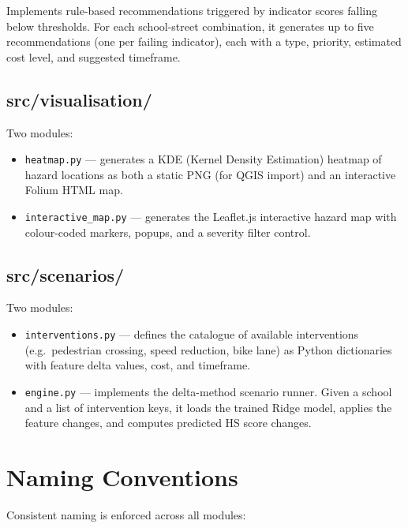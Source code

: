 \documentclass[11pt,a4paper,openany]{book}
\begin{document}
Implements rule-based recommendations triggered by indicator scores falling below thresholds. For each school-street combination, it generates up to five recommendations (one per failing indicator), each with a type, priority, estimated cost level, and suggested timeframe.

\subsection{src/visualisation/}

Two modules:
\begin{itemize}
  \item \texttt{heatmap.py} --- generates a KDE (Kernel Density Estimation) heatmap of hazard locations as both a static PNG (for QGIS import) and an interactive Folium HTML map.
  \item \texttt{interactive\_map.py} --- generates the Leaflet.js interactive hazard map with colour-coded markers, popups, and a severity filter control.
\end{itemize}

\subsection{src/scenarios/}

Two modules:
\begin{itemize}
  \item \texttt{interventions.py} --- defines the catalogue of available interventions (e.g.\ pedestrian crossing, speed reduction, bike lane) as Python dictionaries with feature delta values, cost, and timeframe.
  \item \texttt{engine.py} --- implements the delta-method scenario runner. Given a school and a list of intervention keys, it loads the trained Ridge model, applies the feature changes, and computes predicted HS score changes.
\end{itemize}

\section{Naming Conventions}

Consistent naming is enforced across all modules:
\end{document}
